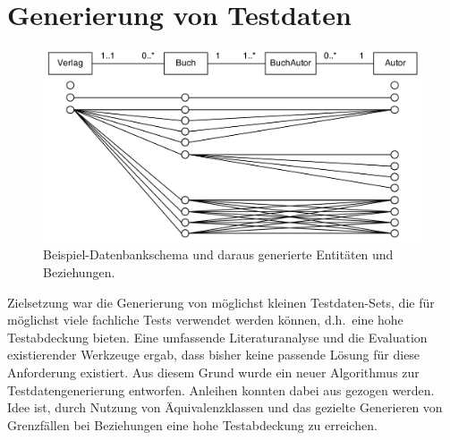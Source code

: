 \section{Generierung von Testdaten}


	\begin{figure}[tb]
		\begin{center}
			\includegraphics[width=12.75cm]{images/generiert.png}
			\caption{\label{generiert}Beispiel-Datenbankschema und daraus generierte Entitäten und Beziehungen.}
		\end{center}
	\end{figure}


Zielsetzung war die Generierung von möglichst kleinen Testdaten-Sets, die für möglichst viele fachliche Tests verwendet werden können, d.h.~eine hohe Testabdeckung bieten. 
%
%
Eine umfassende Literaturanalyse und die Evaluation existierender Werkzeuge ergab, dass bisher keine passende Lösung für diese Anforderung existiert.
%
%
Aus diesem Grund wurde ein neuer Algorithmus zur Testdatengenerierung entworfen. 
%
Anleihen konnten dabei aus \cite{Houkjaer:2006:SRD:1182635.1164254} gezogen werden.
%
Idee ist, durch Nutzung von Äquivalenz\-klas\-sen und das gezielte Generieren von Grenzfällen bei Beziehungen eine hohe Testabdeckung zu erreichen.


